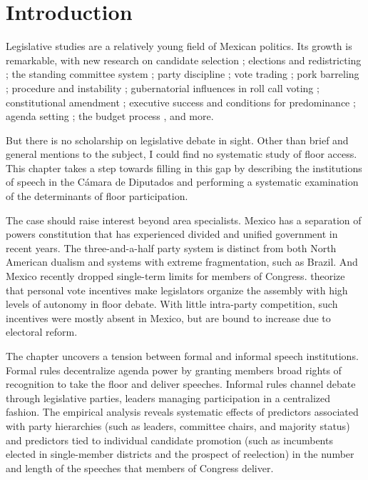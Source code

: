 \documentclass[letter,12pt]{article}
\begin{document}
\doublespacing

\section{Introduction} %

Legislative studies are a relatively young field of Mexican politics. Its growth is remarkable, with new research on candidate selection \citep{ascencio.kerevel.cand-sel-beh.2021}; elections and redistricting \citep{magar.altman.mcd.trelles2016pg}; the standing committee system \citep{bejar.Comisiones2009ed.book}; party discipline \citep{tellez-del-rio.2018}; vote trading \citep{lopez.lara.aldf2013}; pork barreling \citep{kerevelPork2015}; procedure and instability \citep{heller.weldon.2003}; gubernatorial influences in roll call voting \citep{rosas.langston.2011}; constitutional amendment \citep{casar.marvan2014book}; executive success \citep{bejarQuienLegisla2012} and conditions for predominance \citep{weldon.1997}; agenda setting \citep{casar.agsetting.2016}; the budget process \citep{weldon.2002}, and more.

But there is no scholarship on legislative debate in sight. Other than brief and general mentions to the subject, I could find no systematic study of floor access. This chapter takes a step towards filling in this gap by describing the institutions of speech in the Cámara de Diputados and performing a systematic examination of the determinants of floor participation.

The case should raise interest beyond area specialists. Mexico has a separation of powers constitution that has experienced divided and unified government in recent years. The three-and-a-half party system is distinct from both North American dualism and systems with extreme fragmentation, such as Brazil. And Mexico recently dropped single-term limits for members of Congress. \citet{proksch-slapin2015book} theorize that personal vote incentives make legislators organize the assembly with high levels of autonomy in floor debate. With little intra-party competition, such incentives were mostly absent in Mexico, but are bound to increase due to electoral reform. 

The chapter uncovers a tension between formal and informal speech institutions. Formal rules decentralize agenda power by granting members broad rights of recognition to take the floor and deliver speeches. Informal rules channel debate through legislative parties, leaders managing participation in a centralized fashion. The empirical analysis reveals systematic effects of predictors associated with party hierarchies (such as leaders, committee chairs, and majority status) and predictors tied to individual candidate promotion (such as incumbents elected in single-member districts and the prospect of reelection) in the number and length of the speeches that members of Congress deliver. 
\end{document}
